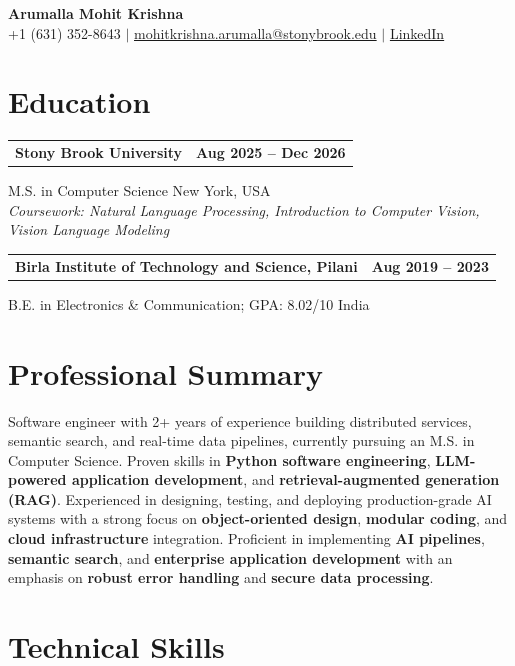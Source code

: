 \documentclass[letterpaper,10pt]{article}
\makeatletter
\newcommand{\entry}[2]{%
  \noindent
  \begin{tabularx}{\linewidth}
    {@{}>{\raggedright\arraybackslash}X@{\hspace{6pt}}r@{}}
    \textbf{#1} & #2
  \end{tabularx}\par
}
\makeatother
\begin{document}
\begin{center}
    {\LARGE\bfseries Arumalla Mohit Krishna}\\[3pt]
    +1 (631) 352-8643 $|$
    \href{mailto:mohitkrishna.arumalla@stonybrook.edu}
    {mohitkrishna.arumalla@stonybrook.edu} $|$
    \href{https://linkedin.com/in/mohit-krishna-arumalla}
    {LinkedIn}
\end{center}
\vspace{-8pt}

\section{Education}

\entry
  {\textbf{Stony Brook University}}
  {\textbf{Aug 2025 -- Dec 2026}}

M.S. in Computer Science \hfill New York, USA\\
\textit{
Coursework: Natural Language Processing,
Introduction to Computer Vision, Vision Language Modeling
}
\vspace{3pt}

\entry
  {\textbf{Birla Institute of Technology and Science, Pilani}}
  {\textbf{Aug 2019 -- 2023}}

B.E. in Electronics \& Communication; GPA: 8.02/10 \hfill India
\section{Professional Summary}

Software engineer with 2+ years of experience building distributed services, semantic search, and real-time data pipelines, currently pursuing an M.S. in Computer Science. Proven skills in \textbf{Python software engineering}, \textbf{LLM-powered application development}, and \textbf{retrieval-augmented generation (RAG)}. Experienced in designing, testing, and deploying production-grade AI systems with a strong focus on \textbf{object-oriented design}, \textbf{modular coding}, and \textbf{cloud infrastructure} integration. Proficient in implementing \textbf{AI pipelines}, \textbf{semantic search}, and \textbf{enterprise application development} with an emphasis on \textbf{robust error handling} and \textbf{secure data processing}.

\section{Technical Skills}
\end{document}
